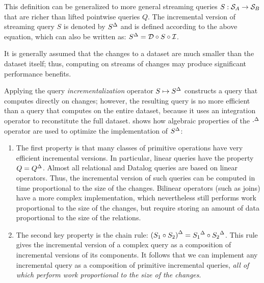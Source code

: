 \begin{center}
\end{center}

This definition can be generalized to more general streaming queries
$S: \mathcal{S}_{A} \to \mathcal{S}_{B}$ that are richer than lifted pointwise queries $Q$.
The incremental version of streaming query $S$ is denoted by ${S}^{\Delta}$ and is defined
according to the above equation, which can also be written as: ${S}^{\Delta} = \mathcal{D} \circ S \circ \mathcal{I}$. 

It is generally assumed that the changes to a dataset are much smaller than
the dataset itself; thus, computing on streams of changes may
produce significant performance benefits.

Applying the query \emph{incrementalization} operator $S \mapsto {S}^{\Delta}$ constructs
a query that computes directly on changes; however, the resulting query is no more
efficient than a query that computes on the entire dataset, because it uses an
integration operator to reconstitute the full dataset.
 shows how algebraic properties of the ${\cdot}^{\Delta}$ operator 
are used to optimize the implementation of ${S}^{\Delta}$:

\begin{enumerate}[nosep, leftmargin=0pt, itemindent=0.5cm, label=\textbf{(\arabic*)}]
\item The first property is that many classes of primitive operations have very efficient incremental
versions.  In particular, linear queries have the property $Q = {Q}^{\Delta}$.  Almost all
relational and Datalog queries are based on linear operators.  Thus, the incremental version
of such queries can be computed in time proportional to the size of the changes.  Bilinear 
operators (such as joins) have a more complex implementation, which nevertheless still performs 
work proportional to the size of the changes, but require storing an amount of data proportional
to the size of the relations.

\item The second key property is the chain rule:
${(S_1 \circ S_2)}^{\Delta} = {S_1}^{\Delta} \circ {S_2}^{\Delta}$.  This rule gives the incremental
version of a complex query as a composition of incremental versions of its components.
It follows that we can implement any incremental query as a composition of primitive
incremental queries, \emph{all of which perform work proportional to the size of the changes}.
\end{enumerate}

